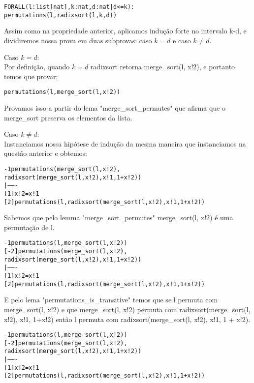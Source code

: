 \documentclass[a4paper, 12pt]{article}
\begin{document}
\begin{alltt}
FORALL(l : list[nat], k : nat, d : nat | d <=k):
  permutations(l, radixsort(l,k,d))
\end{alltt}


Assim como na propriedade anterior, aplicamos indução forte no intervalo k-d, e dividiremos nossa prova em duas subprovas: caso $k = d$ e caso $k \neq d$.


\item Caso $k = d$:\\
Por definição, quando $k = d$ radixsort retorna merge\_sort(l, x!2), e portanto temos que provar:


\begin{alltt}
permutations(l, merge_sort(l, x!2))
\end{alltt}

Provamos isso a partir do lema "merge\_sort\_permutes" que afirma que o merge\_sort preserva os elementos da lista.

 Caso $k \neq d$:\\
Instanciamos nossa hipótese de indução da mesma maneira que instanciamos na questão anterior e obtemos:


\begin{alltt}
{-1}  permutations(merge_sort(l, x!2),
                   radixsort(merge_sort(l, x!2), x!1, 1 + x!2))
  |-------
[1]   x!2 = x!1
[2]   permutations(l, radixsort(merge_sort(l, x!2), x!1, 1 + x!2))
\end{alltt}


Sabemos que pelo lemma "merge\_sort\_permutes" merge\_sort(l, x!2) é uma permutação de l. 


\begin{alltt}
{-1}  permutations(l, merge_sort(l, x!2))
[-2]  permutations(merge_sort(l, x!2),
                   radixsort(merge_sort(l, x!2), x!1, 1 + x!2))
  |-------
[1]   x!2 = x!1
[2]   permutations(l, radixsort(merge_sort(l, x!2), x!1, 1 + x!2))

\end{alltt}


E pelo lema "permutations\_is\_transitive" temos que se l permuta com merge\_sort(l, x!2) e que merge\_sort(l, x!2) permuta com radixsort(merge\_sort(l, x!2), x!1, 1+x!2) então l permuta com radixsort(merge\_sort(l, x!2), x!1, 1 + x!2).


\begin{alltt}
{-1}  permutations(l, merge_sort(l, x!2))
[-2]  permutations(merge_sort(l, x!2),
                   radixsort(merge_sort(l, x!2), x!1, 1 + x!2))
  |-------
[1]   x!2 = x!1
[2]   permutations(l, radixsort(merge_sort(l, x!2), x!1, 1 + x!2))

\end{alltt}
\end{document}
